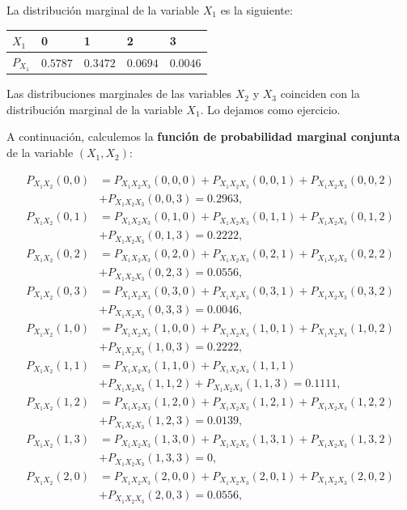 \documentclass[]{book}
\begin{document}
La distribución marginal de la variable \(X_1\) es la siguiente:

\begin{longtable}[]{@{}lllll@{}}
\toprule
\(X_1\) & 0 & 1 & 2 & 3\tabularnewline
\midrule
\endhead
\(P_{X_1}\) & \(0.5787\) & \(0.3472\) & \(0.0694\) & \(0.0046\)\tabularnewline
\bottomrule
\end{longtable}

Las distribuciones marginales de las variables \(X_2\) y \(X_3\) coinciden con la distribución marginal de la variable \(X_1\). Lo dejamos como ejercicio.

A continuación, calculemos la \textbf{función de probabilidad marginal conjunta} de la variable \((X_1,X_2)\):

\[
\begin{array}{rl}
P_{X_1X_2}(0,0) 
& = P_{X_1X_2X_3}(0,0,0)+P_{X_1X_2X_3}(0,0,1)+P_{X_1X_2X_3}(0,0,2)\\
& +P_{X_1X_2X_3}(0,0,3)=0.2963, \\
P_{X_1X_2}(0,1) & = P_{X_1X_2X_3}(0,1,0)+P_{X_1X_2X_3}(0,1,1)+P_{X_1X_2X_3}(0,1,2)\\
& +P_{X_1X_2X_3}(0,1,3)=0.2222, \\
P_{X_1X_2}(0,2) & = P_{X_1X_2X_3}(0,2,0)+P_{X_1X_2X_3}(0,2,1)+P_{X_1X_2X_3}(0,2,2)\\
& +P_{X_1X_2X_3}(0,2,3)=0.0556, \\
P_{X_1X_2}(0,3) & = P_{X_1X_2X_3}(0,3,0)+P_{X_1X_2X_3}(0,3,1)+P_{X_1X_2X_3}(0,3,2)\\
& +P_{X_1X_2X_3}(0,3,3)=0.0046, \\
P_{X_1X_2}(1,0) & = P_{X_1X_2X_3}(1,0,0)+P_{X_1X_2X_3}(1,0,1)+P_{X_1X_2X_3}(1,0,2)\\
& +P_{X_1X_2X_3}(1,0,3)=0.2222, \\
P_{X_1X_2}(1,1) & = P_{X_1X_2X_3}(1,1,0)+P_{X_1X_2X_3}(1,1,1)\\
& +P_{X_1X_2X_3}(1,1,2)+P_{X_1X_2X_3}(1,1,3)=0.1111, \\
P_{X_1X_2}(1,2) & = P_{X_1X_2X_3}(1,2,0)+P_{X_1X_2X_3}(1,2,1)+P_{X_1X_2X_3}(1,2,2)\\
& +P_{X_1X_2X_3}(1,2,3)=0.0139, \\
P_{X_1X_2}(1,3) & = P_{X_1X_2X_3}(1,3,0)+P_{X_1X_2X_3}(1,3,1)+P_{X_1X_2X_3}(1,3,2)\\
& +P_{X_1X_2X_3}(1,3,3)=0, \\
P_{X_1X_2}(2,0) & = P_{X_1X_2X_3}(2,0,0)+P_{X_1X_2X_3}(2,0,1)+P_{X_1X_2X_3}(2,0,2)\\
& +P_{X_1X_2X_3}(2,0,3)=0.0556, \\

\end{array}\]
\end{document}
